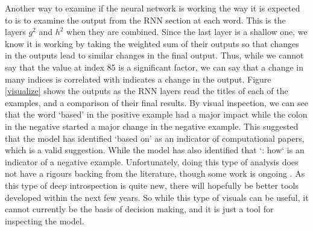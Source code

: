 \documentclass[12pt, a4paper]{article}
\begin{document}
Another way to examine if the neural network is working the way it is expected to is to examine the output from the RNN section at each word. This is the layers $g^2$ and $h^2$ when they are combined. Since the last layer is a shallow one, we know it is working by taking the weighted sum of their outputs so that changes in the outputs lead to similar changes in the final output. Thus, while we cannot say that the value at index 85 is a significant factor, we can say that a change in many indices is correlated with indicates a change in the output. Figure \ref{visualize} shows the outputs as the RNN layers read the titles of each of the examples, and a comparison of their final results. By visual inspection, we can see that the word `based' in the positive example had a major impact while the colon in the negative started a major change in the negative example. This suggested that the model has identified `based on' as an indicator of computational papers, which is a valid suggestion. While the model has also identified that `: how` is an indicator of a negative example. Unfortunately, doing this type of analysis does not have a rigours backing from the literature, though some work is ongoing \citep{strobelt2018lstmvis}. As this type of deep introspection is quite new, there will hopefully be better tools developed within the next few years. So while this type of visuals can be useful, it cannot currently be the basis of decision making, and it is just a tool for inspecting the model.
\end{document}
